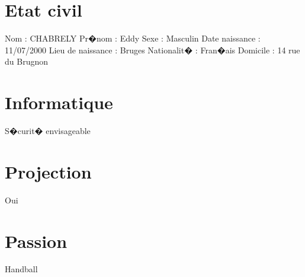 \documentclass{article}
\begin{document}
\section{Etat civil}
Nom : CHABRELY
\newline
Pr�nom : Eddy
\newline
Sexe : Masculin
\newline
Date naissance : 11/07/2000
\newline
Lieu de naissance : Bruges 
\newline
Nationalit� : Fran�ais
\newline
Domicile : 14 rue du Brugnon


\section{Informatique}
S�curit� envisageable

\section{Projection}
Oui

\section{Passion}
Handball
\end{document}
